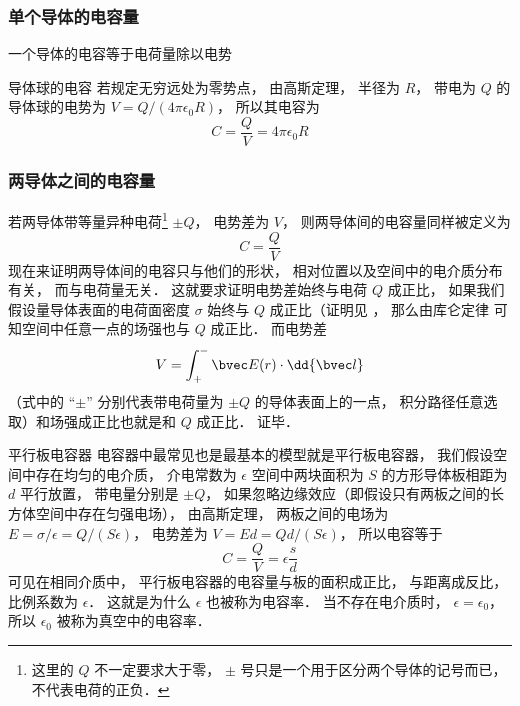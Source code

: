 

\subsubsection{单个导体的电容量}

一个导体的电容等于电荷量除以电势


\begin{exam}{导体球的电容}
若规定无穷远处为零势点， 由高斯定理， 半径为 $R$， 带电为 $Q$ 的导体球的电势为 $V = Q/(4\pi\epsilon_0 R)$， 所以其电容为
\begin{equation}\label{Cpctor_eq1}
C = \frac{Q}{V} = 4\pi\epsilon_0 R
\end{equation}
\end{exam}


\subsubsection{两导体之间的电容量}
若两导体带等量异种电荷\footnote{这里的 $Q$ 不一定要求大于零， $\pm$ 号只是一个用于区分两个导体的记号而已， 不代表电荷的正负．} $\pm Q$， 电势差为 $V$， 则两导体间的电容量同样被定义为
\begin{equation}
C = \frac{Q}{V}
\end{equation}
现在来证明两导体间的电容只与他们的形状， 相对位置以及空间中的电介质分布有关， 而与电荷量无关． 这就要求证明电势差始终与电荷 $Q$ 成正比， 如果我们假设量导体表面的电荷面密度 $\sigma$ 始终与 $Q$ 成正比（证明见%
， 那么由库仑定律%
可知空间中任意一点的场强也与 $Q$ 成正比． 而电势差
\begin{equation}
V = \int_+^- \bvec E(r) \cdot \dd{\bvec l}
\end{equation}
（式中的 “$\pm$” 分别代表带电荷量为 $\pm Q$ 的导体表面上的一点， 积分路径任意选取）和场强成正比也就是和 $Q$ 成正比． 证毕．

\begin{exam}{平行板电容器}\label{Cpctor_exe2}
电容器中最常见也是最基本的模型就是平行板电容器， 我们假设空间中存在均匀的电介质， 介电常数为 $\epsilon$ 空间中两块面积为 $S$ 的方形导体板相距为 $d$ 平行放置， 带电量分别是 $\pm Q$， 如果忽略边缘效应（即假设只有两板之间的长方体空间中存在匀强电场）， 由高斯定理，%
两板之间的电场为 $E = {\sigma}/{\epsilon} = Q/(S\epsilon)$， 电势差为 $V = Ed = Qd/(S\epsilon)$， 所以电容等于
\begin{equation}\label{Cpctor_eq4}
C = \frac{Q}{V} = \epsilon \frac sd
\end{equation}
可见在相同介质中， 平行板电容器的电容量与板的面积成正比， 与距离成反比， 比例系数为 $\epsilon$． 这就是为什么 $\epsilon$ 也被称为电容率． 当不存在电介质时， $\epsilon = \epsilon_0$， 所以 $\epsilon_0$ 被称为真空中的电容率．
\end{exam}

